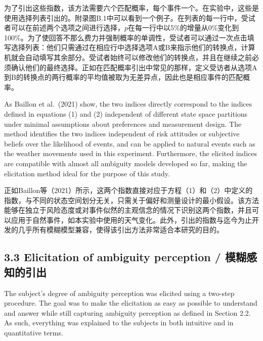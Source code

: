 \documentclass[12pt,a4paper]{article}
\newenvironment{original}
  {\par\medskip\noindent\color{black}\ignorespaces}
  {\par\medskip}
\newenvironment{translation}
  {\par\noindent\color{transblue}\ignorespaces}
  {\par\medskip\medskip}
\begin{document}
\begin{translation}
为了引出这些指数，该方法需要六个匹配概率，每个事件一个。在实验中，这些是使用选择列表引出的。附录图B.1中可以看到一个例子。在列表的每一行中，受试者可以在前述两个选项之间进行选择，$p$在每一行中以5\%的增量从0\%变化到100\%。为了使回答不那么费力并强制概率的单调性，受试者可以通过一次点击填写选择列表：他们只需通过在相应行中选择选项A或B来指示他们的转换点，计算机就会自动填写其余部分。受试者始终可以修改他们的转换点，并且在继续之前必须确认他们的最终选择。正如在匹配概率引出中常见的那样，定义受访者从选项A到B的转换点的两行概率的平均值被取为无差异点，因此也是相应事件的匹配概率。
\end{translation}

\begin{original}
As Baillon et al.\ (2021) show, the two indices directly correspond to the indices defined in equations (1) and (2) independent of different state space partitions under minimal assumptions about preferences and measurement design. The method identifies the two indices independent of risk attitudes or subjective beliefs over the likelihood of events, and can be applied to natural events such as the weather movements used in this experiment. Furthermore, the elicited indices are compatible with almost all ambiguity models developed so far, making the elicitation method ideal for the purpose of this study.
\end{original}

\begin{translation}
正如Baillon等（2021）所示，这两个指数直接对应于方程（1）和（2）中定义的指数，与不同的状态空间划分无关，只需关于偏好和测量设计的最小假设。该方法能够在独立于风险态度或对事件似然的主观信念的情况下识别这两个指数，并且可以应用于自然事件，如本实验中使用的天气变化。此外，引出的指数与迄今为止开发的几乎所有模糊模型兼容，使得该引出方法非常适合本研究的目的。
\end{translation}

\subsection{3.3 Elicitation of ambiguity perception / 模糊感知的引出}

\begin{original}
The subject's degree of ambiguity perception was elicited using a two-step procedure. The goal was to make the elicitation as easy as possible to understand and answer while still capturing ambiguity perception as defined in Section 2.2. As such, everything was explained to the subjects in both intuitive and in quantitative terms.
\end{original}
\end{document}
